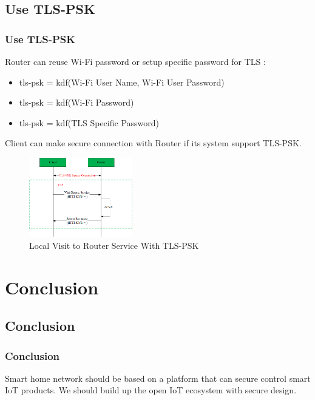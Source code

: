 \documentclass{ctexbeamer}
\begin{document}
\subsection{Use TLS-PSK}
\begin{frame}
\frametitle{Use TLS-PSK}

Router can reuse Wi-Fi password or setup specific password for TLS :  
    \begin{itemize}
\item        tls-psk = kdf(Wi-Fi User Name, Wi-Fi User Password) 

    \item    tls-psk = kdf(Wi-Fi Password)

       \item  tls-psk = kdf(TLS Specific Password)
    \end{itemize}

Client can make secure connection with Router if its system support TLS-PSK.

    \begin{figure}[H]
        \centering 
        \includegraphics[width=0.4\textwidth]{pic/tls_psk.png} 
        \caption{Local Visit to Router Service With TLS-PSK} 
        \label{fig.tls.psk}
    \end{figure}

\end{frame}

\section{Conclusion}

\subsection{Conclusion}
\begin{frame}
\frametitle{Conclusion}

Smart home network should be based on a platform that can secure control smart IoT products.
\newline
\newline
We should build up the open IoT ecosystem with secure design.
\newline
\newline

\end{frame}
\end{document}
